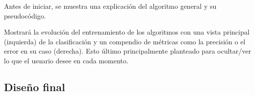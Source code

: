 Antes de iniciar, se muestra una explicación del algoritmo general y su pseudocódigo.



Mostrará la evolución del entrenamiento de los algoritmos con una vista
principal (izquierda) de la clasificación y un compendio de métricas como la
precisión o el error en su caso (derecha). Esto último principalmente
planteado para ocultar/ver lo que el usuario desee en cada momento.

\subsection{Diseño final}

